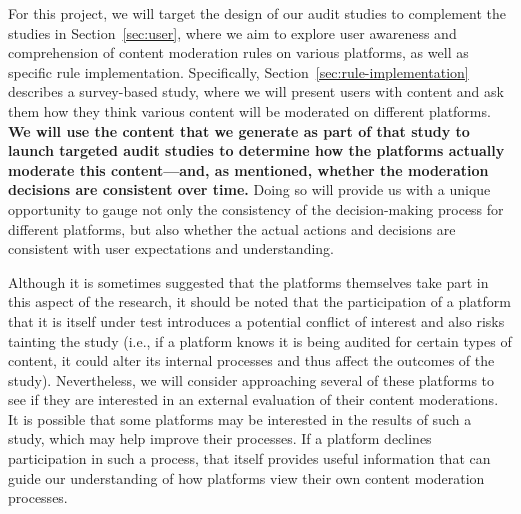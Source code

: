 For this project, we will target the design of our audit studies to complement
the studies in Section~\ref{sec:user}, where we aim to explore user awareness
and comprehension of content moderation rules on various platforms, as well as
specific rule implementation. Specifically,
Section~\ref{sec:rule-implementation} describes a survey-based study, where we
will present users with content and ask them how they think various content
will be moderated on different platforms. {\bf We will use the content that we
generate as part of that study to launch targeted audit studies to determine
how the platforms actually moderate this content---and, as mentioned, whether
the moderation decisions are consistent over time.} Doing so will provide us
with a unique opportunity to gauge not only the consistency of the
decision-making process for different platforms, but also whether the actual
actions and decisions are consistent with user expectations and understanding.

Although it is sometimes suggested that the platforms themselves take part in
this aspect of the research, it should be noted that the participation of a
platform that it is itself under test introduces a potential conflict of
interest and also risks tainting the study (i.e., if a platform knows it is
being audited for certain types of content, it could alter its internal
processes and thus affect the outcomes of the study). Nevertheless, we will
consider approaching several of these platforms to see if they are interested
in an external evaluation of their content moderations. It is possible that
some platforms may be interested in the results of such a study, which may
help improve their processes. If a platform declines participation in such a
process, that itself provides useful information that can guide our
understanding of how platforms view their own content moderation processes.

